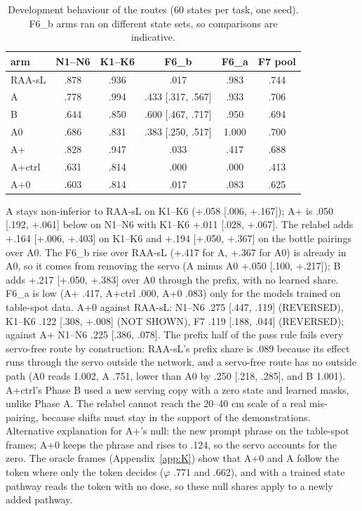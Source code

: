 \begin{table}[h]
\caption{Development behaviour of the routes (60 states per task, one seed). F6\_b arms ran on different state sets, so comparisons are indicative.}
\label{tab:E1}
\centering
\footnotesize
\begin{tabular}{@{}lccccc@{}}
\toprule
arm & N1--N6 & K1--K6 & F6\_b & F6\_a & F7 pool \\
\midrule
RAA-sL & .878 & .936 & .017 & .983 & .744 \\
A & .778 & .994 & .433 [.317, .567] & .933 & .706 \\
B & .644 & .850 & .600 [.467, .717] & .950 & .694 \\
A0 & .686 & .831 & .383 [.250, .517] & 1.000 & .700 \\
A+ & .828 & .947 & .033 & .417 & .688 \\
A+ctrl & .631 & .814 & .000 & .000 & .413 \\
A+0 & .603 & .814 & .017 & .083 & .625 \\
\bottomrule
\end{tabular}
\end{table}

A stays non-inferior to RAA-sL on K1--K6 (+.058 [\mi.006, +.167]); A+ is \mi.050 [\mi.192, +.061] below on N1--N6 with K1--K6 +.011 [\mi.028, +.067]. The relabel adds +.164 [+.006, +.403] on K1--K6 and +.194 [+.050, +.367] on the bottle pairings over A0. The F6\_b rise over RAA-sL (+.417 for A, +.367 for A0) is already in A0, so it comes from removing the servo (A minus A0 +.050 [\mi.100, +.217]); B adds +.217 [+.050, +.383] over A0 through the prefix, with no learned share. F6\_a is low (A+ .417, A+ctrl .000, A+0 .083) only for the models trained on table-spot data. A+0 against RAA-sL: N1--N6 \mi.275 [\mi.447, \mi.119] (REVERSED), K1--K6 \mi.122 [\mi.308, +.008] (NOT SHOWN), F7 \mi.119 [\mi.188, \mi.044] (REVERSED); against A+ N1--N6 \mi.225 [\mi.386, \mi.078]. The prefix half of the pass rule fails every servo-free route by construction: RAA-sL's prefix share is .089 because its effect runs through the servo outside the network, and a servo-free route has no outside path (A0 reads 1.002, A .751, lower than A0 by .250 [.218, .285], and B 1.001). A+ctrl's Phase B used a new serving copy with a zero state and learned masks, unlike Phase A. The relabel cannot reach the 20--40 cm scale of a real mis-pairing, because shifts must stay in the support of the demonstrations. Alternative explanation for A+'s null: the new prompt phrase on the table-spot frames; A+0 keeps the phrase and rises to .124, so the servo accounts for the zero. The oracle frames (Appendix~\ref{app:K}) show that A+0 and A follow the token where only the token decides ($\varphi$ .771 and .662), and \pizero{} with a trained state pathway reads the token with no dose, so these null shares apply to a newly added pathway.

